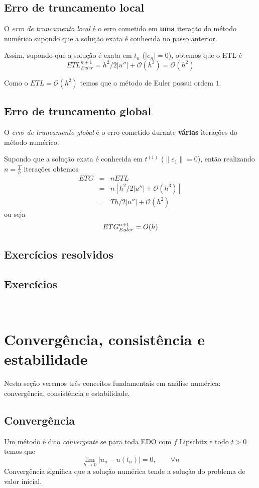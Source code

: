 \subsection{Erro de truncamento local}

O \emph{erro de truncamento local} é o erro cometido em \textbf{uma} iteração do método numérico supondo que a solução exata é conhecida no passo anterior.

Assim, supondo que a solução é exata em $t_n$ ($|e_n|=0$), obtemos que o ETL é
$$ETL_{Euler}^{n+1}= h^2/2|u''|+ \mathcal O(h^3) = \mathcal O(h^2)$$

Como o $ETL=\mathcal O(h^2)$ temos que o método de Euler possui ordem $1$.


\subsection{Erro de truncamento global}
O \emph{erro de truncamento global} é o erro cometido durante \textbf{várias} iterações do método numérico.

Supondo que a solução exata é conhecida em $t^{(1)}$ ($\|e_1\|=0$), então realizando $n=\frac{T}{h}$ iterações obtemos
\begin{eqnarray}
   ETG &=& nETL \\
       &=& n[h^2/2|u''|+ \mathcal O(h^3)] \\
       &=& Th/2|u''|+ \mathcal O(h^2)
\end{eqnarray}
ou seja
$$ETG_{Euler}^{n+1} = \mathcal \mathcal{O}(h)$$

\subsection*{Exercícios resolvidos}

\emconstrucao

\subsection*{Exercícios}
\

\section{Convergência, consistência e estabilidade}
Nesta seção veremos três conceitos fundamentais em análise numérica: convergência, consistência e estabilidade.

\subsection{Convergência}
Um método é dito \emph{convergente} se para toda EDO com $f$ Lipschitz e todo $t>0$ temos que
$$ \lim_{h \rightarrow 0} |u_n - u(t_n)| =0, \quad \quad \forall n$$
Convergência significa que a solução numérica tende a solução do problema de valor inicial.


